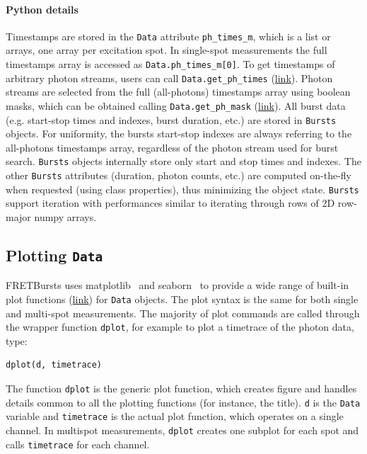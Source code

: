 \documentclass[10pt,letterpaper]{article}
\begin{document}
\paragraph{Python details}
Timestamps are stored in the \verb|Data| attribute \verb|ph_times_m|, which is a list
or arrays, one array per excitation spot. In single-spot measurements the full
timestamps array is accessed as \verb|Data.ph_times_m[0]|. To get  timestamps
of arbitrary photon streams, users can call \verb|Data.get_ph_times|
(\href{http://fretbursts.readthedocs.org/en/latest/data_class.html?highlight=get_ph_times#fretbursts.burstlib.Data.get_ph_times}{link}).
Photon streams are selected from the full (all-photons) timestamps array using
boolean masks, which can be obtained calling \verb|Data.get_ph_mask|
(\href{http://fretbursts.readthedocs.org/en/latest/data_class.html?highlight=get_ph_mask#fretbursts.burstlib.Data.get_ph_mask}{link}).
All burst data (e.g. start-stop times and indexes, burst duration, etc.) are stored in
\verb|Bursts| objects. For uniformity, the bursts start-stop
indexes are always referring to the all-photons timestamps array,
regardless of the photon stream used for burst search.
\verb|Bursts| objects
internally store only start and stop times and indexes.
The other \verb|Bursts| attributes (duration, photon counts, etc.) are computed on-the-fly
when requested (using class properties), thus minimizing the object state.
\verb|Bursts| support iteration
with performances similar to iterating through rows of 2D row-major numpy arrays.


\subsection{Plotting \texttt{Data}}
\label{sec:plotting}

FRETBursts uses
matplotlib~\cite{matplotlib}
and seaborn~\cite{seaborn}
to provide a wide range of built-in plot functions
(\href{http://fretbursts.readthedocs.org/en/latest/plots.html}{link})
for \verb|Data| objects.
The plot syntax is the same for both single and multi-spot measurements.
The majority of plot commands are called through the wrapper function
\verb|dplot|, for example to plot a timetrace of the photon data, type:

\begin{lstlisting}
dplot(d, timetrace)
\end{lstlisting}

The function \verb|dplot| is the generic plot function, which creates figure
and handles details common to all the plotting functions (for instance, the title).
\verb|d| is the \verb|Data| variable and \verb|timetrace| is the actual plot
function, which operates on a single channel. In multispot measurements,
\verb|dplot| creates one subplot for each spot and calls \verb|timetrace| for
each channel.
\end{document}
